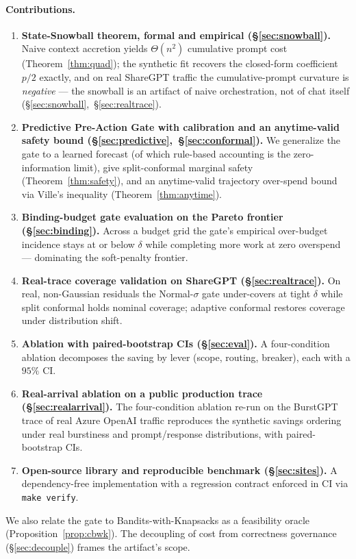 \documentclass[11pt]{article}
\theoremstyle{plain}
\theoremstyle{definition}
\theoremstyle{remark}
\begin{document}
\paragraph{Contributions.}
\begin{enumerate}[leftmargin=1.5em,itemsep=2pt]
\item \textbf{State-Snowball theorem, formal and empirical (\S\ref{sec:snowball}).} Naive context accretion yields $\Theta(n^2)$ cumulative prompt cost (Theorem~\ref{thm:quad}); the synthetic fit recovers the closed-form coefficient $p/2$ exactly, and on real ShareGPT traffic the cumulative-prompt curvature is \emph{negative} --- the snowball is an artifact of naive orchestration, not of chat itself (\S\ref{sec:snowball},~\S\ref{sec:realtrace}).
\item \textbf{Predictive Pre-Action Gate with calibration and an anytime-valid safety bound (\S\ref{sec:predictive},~\S\ref{sec:conformal}).} We generalize the gate to a learned forecast (of which rule-based accounting is the zero-information limit), give split-conformal marginal safety (Theorem~\ref{thm:safety}), and an anytime-valid trajectory over-spend bound via Ville's inequality (Theorem~\ref{thm:anytime}).
\item \textbf{Binding-budget gate evaluation on the Pareto frontier (\S\ref{sec:binding}).} Across a budget grid the gate's empirical over-budget incidence stays at or below $\delta$ while completing more work at zero overspend --- dominating the soft-penalty frontier.
\item \textbf{Real-trace coverage validation on ShareGPT (\S\ref{sec:realtrace}).} On real, non-Gaussian residuals the Normal-$\sigma$ gate under-covers at tight $\delta$ while split conformal holds nominal coverage; adaptive conformal restores coverage under distribution shift.
\item \textbf{Ablation with paired-bootstrap CIs (\S\ref{sec:eval}).} A four-condition ablation decomposes the saving by lever (scope, routing, breaker), each with a $95\%$ CI.
\item \textbf{Real-arrival ablation on a public production trace (\S\ref{sec:realarrival}).} The four-condition ablation re-run on the BurstGPT trace of real Azure OpenAI traffic reproduces the synthetic savings ordering under real burstiness and prompt/response distributions, with paired-bootstrap CIs.
\item \textbf{Open-source library and reproducible benchmark (\S\ref{sec:sites}).} A dependency-free implementation with a regression contract enforced in CI via \texttt{make verify}.
\end{enumerate}
We also relate the gate to Bandits-with-Knapsacks as a feasibility oracle (Proposition~\ref{prop:cbwk}). The decoupling of cost from correctness governance (\S\ref{sec:decouple}) frames the artifact's scope.
\end{document}
